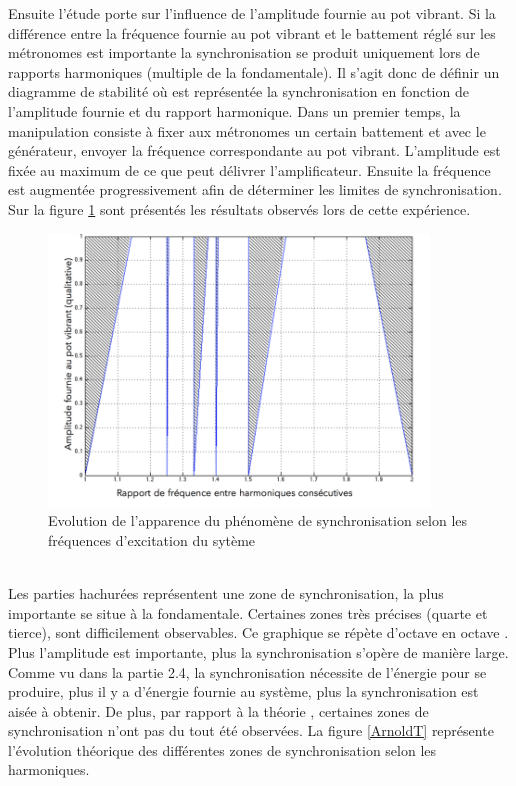 \documentclass[a4paper,11pt]{report}
\begin{document}
Ensuite l'étude porte sur l'influence de l'amplitude fournie au pot vibrant. Si la différence entre la fréquence fournie au pot vibrant et le battement réglé sur les métronomes est importante la synchronisation se produit uniquement lors de rapports harmoniques (multiple de la fondamentale). Il s'agit donc de définir un diagramme de stabilité où est représentée la synchronisation en fonction de l'amplitude fournie et du rapport harmonique. Dans un premier temps, la manipulation consiste à fixer aux métronomes un certain battement et avec le générateur, envoyer la fréquence correspondante au pot vibrant. L'amplitude est fixée au maximum de ce que peut délivrer l'amplificateur. Ensuite la fréquence est augmentée progressivement afin de déterminer les limites de synchronisation. Sur la figure \ref{ArnoldE} sont présentés les résultats observés lors de cette expérience.
\begin{figure}[h]
\centering
\includegraphics[width=0.9\textwidth]{Arnold_tongues_exp_trait}
\caption{Evolution de l'apparence du phénomène de synchronisation selon les fréquences d'excitation du sytème}\label{ArnoldE}
\end{figure}\\
Les parties hachurées représentent une zone de synchronisation, la plus importante se situe à la fondamentale. Certaines zones très précises (quarte et tierce), sont difficilement observables. Ce graphique se répète d'octave en octave \cite{panta}. Plus l'amplitude est importante, plus la synchronisation s'opère de manière large. Comme vu dans la partie 2.4, la synchronisation nécessite de l'énergie pour se produire, plus il y a d'énergie fournie au système, plus la synchronisation est aisée à obtenir.  De plus, par rapport à la théorie \cite{wiki}, certaines zones de synchronisation n'ont pas du tout été observées. La figure \ref{ArnoldT} représente l'évolution théorique des différentes zones de synchronisation selon les harmoniques.
\end{document}
